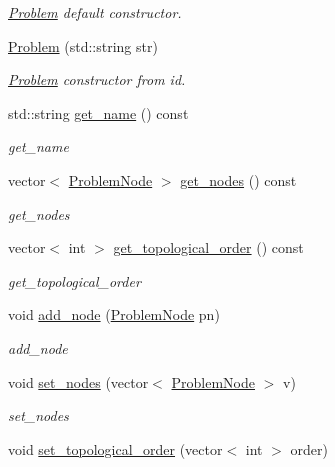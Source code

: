 \begin{DoxyCompactItemize}
\begin{DoxyCompactList}\small\item\em \hyperlink{class_problem}{Problem} default constructor. \end{DoxyCompactList}\item 
\hyperlink{class_problem_a74ddc3c09106a84d87d4502548413377}{Problem} (std\+::string str)
\begin{DoxyCompactList}\small\item\em \hyperlink{class_problem}{Problem} constructor from id. \end{DoxyCompactList}\item 
std\+::string \hyperlink{class_problem_ab4f111fb9da3f1fcd16ffa14457f0aae}{get\+\_\+name} () const 
\begin{DoxyCompactList}\small\item\em get\+\_\+name \end{DoxyCompactList}\item 
vector$<$ \hyperlink{class_problem_node}{Problem\+Node} $>$ \hyperlink{class_problem_ae2dfee734de56153e9ff085bed5fc1f0}{get\+\_\+nodes} () const 
\begin{DoxyCompactList}\small\item\em get\+\_\+nodes \end{DoxyCompactList}\item 
vector$<$ int $>$ \hyperlink{class_problem_a56e5919f4e6d4308e92f56fcb9b95ed4}{get\+\_\+topological\+\_\+order} () const 
\begin{DoxyCompactList}\small\item\em get\+\_\+topological\+\_\+order \end{DoxyCompactList}\item 
void \hyperlink{class_problem_a68ad297a4385a35018794d2580b5b707}{add\+\_\+node} (\hyperlink{class_problem_node}{Problem\+Node} pn)
\begin{DoxyCompactList}\small\item\em add\+\_\+node \end{DoxyCompactList}\item 
void \hyperlink{class_problem_ad83a6285853363fc0ca833cb22791be0}{set\+\_\+nodes} (vector$<$ \hyperlink{class_problem_node}{Problem\+Node} $>$ v)
\begin{DoxyCompactList}\small\item\em set\+\_\+nodes \end{DoxyCompactList}\item 
void \hyperlink{class_problem_a7a4205b2adfe4077032c2953022684f1}{set\+\_\+topological\+\_\+order} (vector$<$ int $>$ order)

\end{DoxyCompactItemize}
